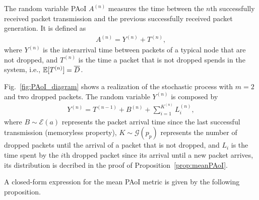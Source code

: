 The random variable PAoI $A^{(n)}$ measures the time between the $n$th successfully received packet transmission and the previous successfully received packet generation. It is defined as
\begin{align}\label{eq:A}
    A^{(n)} = Y^{(n)}+T^{(n)},
\end{align}
where $Y^{(n)}$ is the interarrival time between packets of a typical node that are not dropped, and $T^{(n)}$ is the time a packet that is not dropped spends in the system, i.e., ${\mathbb E}[T^{(n)}] = \overline{D}$.

Fig.~\ref{fig:PAoI_diagram} shows a realization of the stochastic process with $m=2$ and two dropped packets.
%
The random variable $Y^{(n)}$ is composed by
\begin{align}\label{eq:Y}
    Y^{(n)} = T^{(n-1)} + B^{(n)} + \sum_{i=1}^{K^{(n)}} L^{(n)}_i,%
\end{align}%
where $B\sim\mathscr{E}(a)$ %
represents the packet arrival time since the last successful transmission (memoryless property),
%
$K\sim\mathscr{G}(p_p)$ %
represents the number of dropped packets until the arrival of a packet that is not dropped,
%
and $L_i$ is the time spent by the $i$th dropped packet since its arrival until a new packet arrives, its distribution is decribed in the proof of Proposition~\ref{prop:meanPAoI}. %
%

A closed-form expression for the mean PAoI metric is given by the following proposition.

